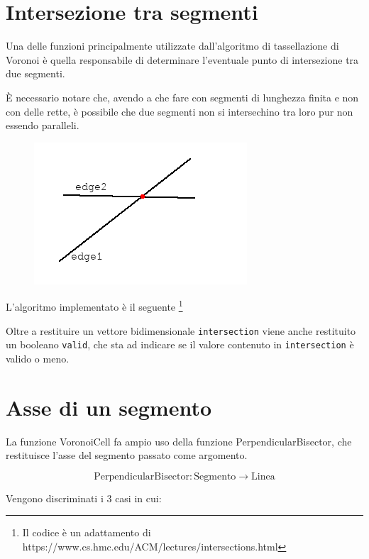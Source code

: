\documentclass[11pt,a4paper]{report}
\newcommand{\modelicaclass}[1]{
	
}
\newcommand{\name}[1]{{\ttfamily #1}}
\begin{document}
\modelicaclass{LineToSegment.mo}

\section{Intersezione tra segmenti}

Una delle funzioni principalmente utilizzate dall'algoritmo di tassellazione di Voronoi è quella responsabile di determinare l'eventuale punto di intersezione tra due segmenti.

È necessario notare che, avendo a che fare con segmenti di lunghezza finita e non con delle rette, è possibile che due segmenti non si intersechino tra loro pur non essendo paralleli.

\begin{figure}[H]
\centering
\includegraphics[scale=0.5]{intersection.png}
\end{figure}

L'algoritmo implementato è il seguente \footnote{Il codice è un adattamento di https://www.cs.hmc.edu/ACM/lectures/intersections.html}

\modelicaclass{SegmentsIntersection.mo}

Oltre a restituire un vettore bidimensionale \verb|intersection| viene anche restituito un booleano \verb|valid|, che sta ad indicare se il valore contenuto in \verb|intersection| è valido o meno.

\section{Asse di un segmento}

La funzione \name{VoronoiCell} fa ampio uso della funzione \name{PerpendicularBisector}, che restituisce l'asse del segmento passato come argomento.

\[
\text{PerpendicularBisector} : \text{Segmento} \longrightarrow \text{Linea}
\]


Vengono discriminati i 3 casi in cui:
\end{document}
